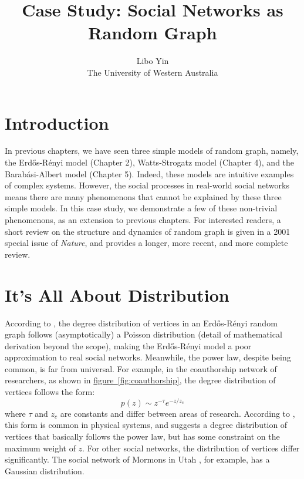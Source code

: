 \documentclass[11pt,a4paper]{article}
\newcommand{\ER}{Erd\H{o}s-R\'{e}nyi }
\begin{document}
\title{Case Study: Social Networks as Random Graph}
\author{Libo Yin\\The University of Western Australia}
\maketitle

\section{Introduction}

In previous chapters, we have seen three simple models of random graph, namely, the \ER model (Chapter 2), Watts-Strogatz model (Chapter 4), and the Barab\'{a}si-Albert model (Chapter 5). Indeed, these models are intuitive examples of complex systems. However, the social processes in real-world social networks means there are many phenomenons that cannot be explained by these three simple models. In this case study, we demonstrate a few of these non-trivial phenomenons, as an extension to previous chapters. For interested readers, a short review \cite{strogatz2001exploring} on the structure and dynamics of random graph is given in a 2001 special issue of \emph{Nature}, and \cite{boccaletti2006complex} provides a longer, more recent, and more complete review.

\section{It's All About Distribution}

According to \cite{newman2002random}, the degree distribution of vertices in an \ER random graph follows (asymptotically) a Poisson distribution (detail of mathematical derivation beyond the scope), making the \ER model a poor approximation to real social networks. Meanwhile, the power law, despite being common, is far from universal. For example, in the coauthorship network of researchers, as shown in \hyperref[fig:coauthorship]{figure~\ref{fig:coauthorship}}, the degree distribution of vertices follows the form:
\begin{equation}
p(z)\sim z^{-\tau}e^{-z/z_c}
\label{eqn:truncated_power_law}
\end{equation}
where $\tau$ and $z_c$ are constants and differ between areas of research. According to \cite{newman2001structure}, this form is common in physical systems, and suggests a degree distribution of vertices that basically follows the power law, but has some constraint on the maximum weight of $z.$ For other social networks, the distribution of vertices differ significantly. The social network of Mormons in Utah \cite{nunes2000classes}, for example, has a Gaussian distribution.
\end{document}
